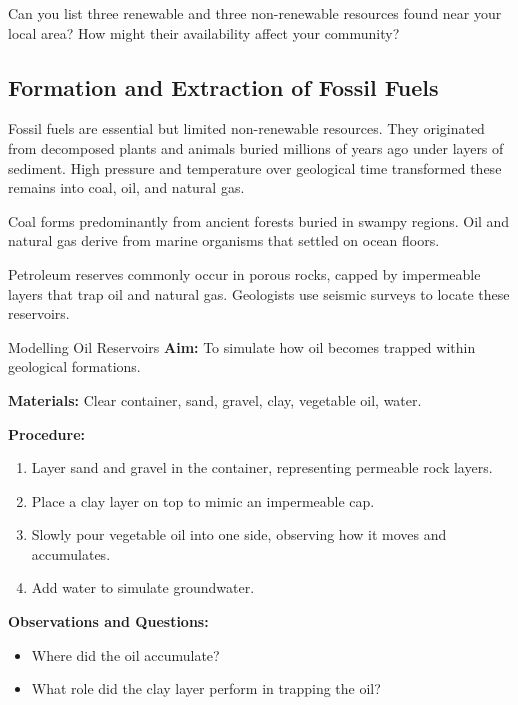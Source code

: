 \begin{stopandthink}
Can you list three renewable and three non-renewable resources found near your local area? How might their availability affect your community?
\end{stopandthink}

\subsection{Formation and Extraction of Fossil Fuels}

Fossil fuels are essential but limited non-renewable resources. They originated from decomposed plants and animals buried millions of years ago under layers of sediment. High pressure and temperature over geological time transformed these remains into coal, oil, and natural gas.

Coal forms predominantly from ancient forests buried in swampy regions. Oil and natural gas derive from marine organisms that settled on ocean floors.

\begin{example}
Petroleum reserves commonly occur in porous rocks, capped by impermeable layers that trap oil and natural gas. Geologists use seismic surveys to locate these reservoirs.
\end{example}

\begin{investigation}{Modelling Oil Reservoirs}
\textbf{Aim:} To simulate how oil becomes trapped within geological formations.

\textbf{Materials:} Clear container, sand, gravel, clay, vegetable oil, water.

\textbf{Procedure:}
\begin{enumerate}
    \item Layer sand and gravel in the container, representing permeable rock layers.
    \item Place a clay layer on top to mimic an impermeable cap.
    \item Slowly pour vegetable oil into one side, observing how it moves and accumulates.
    \item Add water to simulate groundwater.
\end{enumerate}

\textbf{Observations and Questions:}
\begin{itemize}
    \item Where did the oil accumulate?
    \item What role did the clay layer perform in trapping the oil?
\end{itemize}
\end{investigation}

